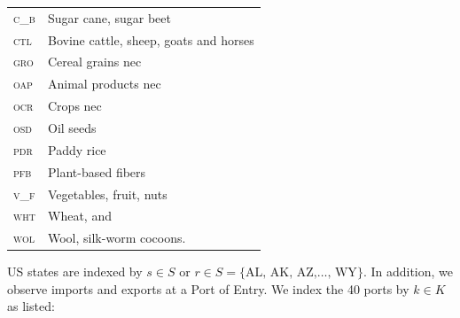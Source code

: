 \documentclass{ejb}
\begin{document}
\vspace{5pt}
\begin{tabular}{ll}
\textsc{c\_b}&Sugar cane, sugar beet\\
\textsc{ctl}&Bovine cattle, sheep, goats and horses\\
\textsc{gro}&Cereal grains nec\\
\textsc{oap}&Animal products nec\\
\textsc{ocr}&Crops nec\\
\textsc{osd}&Oil seeds\\
\textsc{pdr}&Paddy rice\\
\textsc{pfb}&Plant-based fibers\\
\textsc{v\_f}&Vegetables, fruit, nuts\\
\textsc{wht}&Wheat, and\\
\textsc{wol}&Wool, silk-worm cocoons.\\
\end{tabular}
\vspace{5pt}

\noindent US states are indexed by $s
\in S$ or $r \in S = \{\mbox{AL, AK, AZ,} \ldots\mbox{, WY}\}$.  In
addition, we observe imports and exports at a Port of Entry.  We index
the 40 ports by $k \in K$ as listed:
\end{document}
